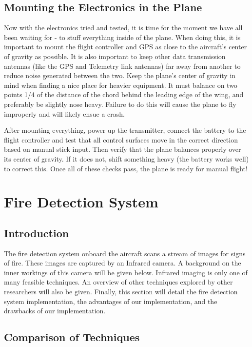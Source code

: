 \documentclass[12pt,journal,compsoc]{IEEEtran}
\begin{document}
\subsection{Mounting the Electronics in the Plane}
Now with the electronics tried and tested, it is time for the moment we have all been waiting for - to stuff everything inside of the plane. When doing this, it is important to mount the flight controller and GPS as close to the aircraft's center of gravity as possible. It is also important to keep other data transmission antennas (like the GPS and Telemetry link antennas) far away from another to reduce noise generated between the two. Keep the plane's center of gravity in mind when finding a nice place for heavier equipment. It must balance on two points 1/4 of the distance of the chord behind the leading edge of the wing, and preferably be slightly nose heavy. Failure to do this will cause the plane to fly improperly and will likely ensue a crash.

After mounting everything, power up the transmitter, connect the battery to the flight controller and test that all control surfaces move in the correct direction based on manual stick input. Then verify that the plane balances properly over its center of gravity. If it does not, shift something heavy (the battery works well) to correct this. Once all of these checks pass, the plane is ready for manual flight!

\section{Fire Detection System}

\subsection{Introduction}
The fire detection system onboard the aircraft scans a stream of images for signs of fire. These images are captured by an Infrared camera. A background on the inner workings of this camera will be given below. Infrared imaging is only one of many feasible techniques. An overview of other techniques explored by other researchers will also be given. Finally, this section will detail the fire detection system implementation, the advantages of our implementation, and the drawbacks of our implementation. 

\subsection{Comparison of Techniques} \label{fire_comparison_section}
\end{document}
